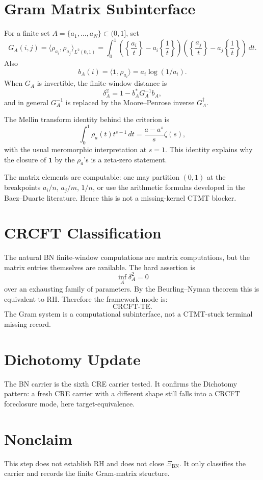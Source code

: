 \documentclass[11pt]{article}
\newcommand{\XiBN}{\Xi_{\mathrm{BN}}}
\newcommand{\one}{\mathbf 1}
\newcommand{\CRCFT}{\mathrm{CRCFT}}
\begin{document}
\section*{Gram Matrix Subinterface}

For a finite set \(A=\{a_1,\dots,a_N\}\subset(0,1]\), set
\[
G_A(i,j)=\langle \rho_{a_i},\rho_{a_j}\rangle_{L^2(0,1)}
=
\int_0^1
\left(\left\{\frac{a_i}{t}\right\}-a_i\left\{\frac1t\right\}\right)
\left(\left\{\frac{a_j}{t}\right\}-a_j\left\{\frac1t\right\}\right)
\,dt.
\]
Also
\[
b_A(i)=\langle \one,\rho_{a_i}\rangle
=a_i\log(1/a_i).
\]
When \(G_A\) is invertible, the finite-window distance is
\[
\delta_A^2
=
1-b_A^*G_A^{-1}b_A,
\]
and in general \(G_A^{-1}\) is replaced by the Moore--Penrose inverse \(G_A^\dagger\).

The Mellin transform identity behind the criterion is
\[
\int_0^1 \rho_a(t)t^{s-1}\,dt
=
\frac{a-a^s}{s}\zeta(s),
\]
with the usual meromorphic interpretation at \(s=1\).  This identity explains why the closure of \(\one\) by the \(\rho_a\)'s is a zeta-zero statement.

The matrix elements are computable: one may partition \((0,1)\) at the breakpoints \(a_i/n\), \(a_j/m\), \(1/n\), or use the arithmetic formulas developed in the Baez--Duarte literature.  Hence this is not a missing-kernel CTMT blocker.

\section*{CRCFT Classification}

The natural BN finite-window computations are matrix computations, but the matrix entries themselves are available.  The hard assertion is
\[
\inf_A \delta_A^2=0
\]
over an exhausting family of parameters.  By the Beurling--Nyman theorem this is equivalent to RH.  Therefore the framework mode is:
\[
\boxed{\CRCFT\text{-TE}.}
\]
The Gram system is a computational subinterface, not a CTMT-stuck terminal missing record.

\section*{Dichotomy Update}

The BN carrier is the sixth CRE carrier tested.  It confirms the Dichotomy pattern: a fresh CRE carrier with a different shape still falls into a CRCFT foreclosure mode, here target-equivalence.

\section*{Nonclaim}

This step does not establish RH and does not close \(\XiBN\).  It only classifies the carrier and records the finite Gram-matrix structure.
\end{document}
